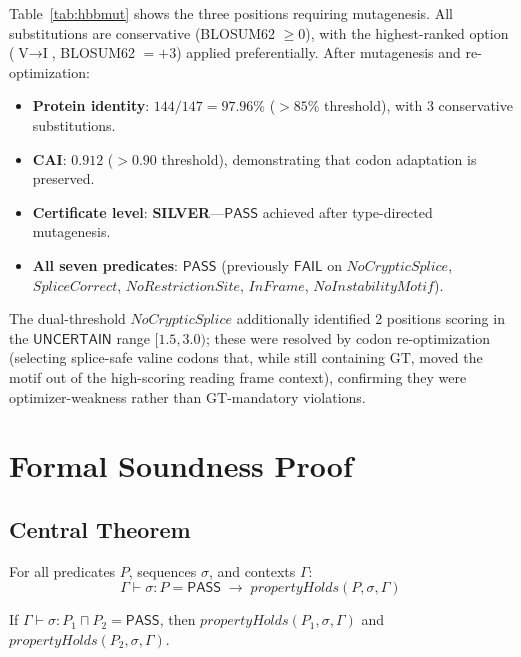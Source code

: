 \documentclass[runningheads]{llncs}
\newcommand{\PASS}{\ensuremath{\mathsf{PASS}}\xspace}
\newcommand{\FAIL}{\ensuremath{\mathsf{FAIL}}\xspace}
\newcommand{\UNCERTAIN}{\ensuremath{\mathsf{UNCERTAIN}}\xspace}
\newcommand{\tand}{\sqcap}
\newcommand{\seq}{\sigma}
\newcommand{\pred}{P}
\newcommand{\judg}[3]{#1 \vdash #2 : #3}
\begin{document}
Table~\ref{tab:hbbmut} shows the three positions requiring mutagenesis.
All substitutions are conservative (BLOSUM62 $\ge 0$), with the highest-ranked option ($\text{V}\to\text{I}$, BLOSUM62 $= +3$) applied preferentially.
After mutagenesis and re-optimization:

\begin{itemize}[leftmargin=*,itemsep=0pt,topsep=1pt]
\item \textbf{Protein identity}: $144/147 = 97.96\%$ ($>85\%$ threshold), with 3 conservative substitutions.
\item \textbf{CAI}: $0.912$ ($>0.90$ threshold), demonstrating that codon adaptation is preserved.
\item \textbf{Certificate level}: \textbf{SILVER}---\PASS{} achieved after type-directed mutagenesis.
\item \textbf{All seven predicates}: \PASS{} (previously \FAIL{} on $\mathit{NoCrypticSplice}$, $\mathit{SpliceCorrect}$, $\mathit{NoRestrictionSite}$, $\mathit{InFrame}$, $\mathit{NoInstabilityMotif}$).
\end{itemize}

The dual-threshold $\mathit{NoCrypticSplice}$ additionally identified 2 positions scoring in the \UNCERTAIN{} range $[1.5, 3.0)$; these were resolved by codon re-optimization (selecting splice-safe valine codons that, while still containing GT, moved the motif out of the high-scoring reading frame context), confirming they were optimizer-weakness rather than GT-mandatory violations.

\section{Formal Soundness Proof}\label{sec:soundness}

\subsection{Central Theorem}

\begin{theorem}\label{thm:sound}
For all predicates $\pred$, sequences $\seq$, and contexts $\Gamma$:
\[
  \judg{\Gamma}{\seq}{\pred} = \PASS \;\longrightarrow\; \mathit{propertyHolds}(\pred, \seq, \Gamma)
\]
\end{theorem}

\begin{corollary}\label{cor:comp}
If $\judg{\Gamma}{\seq}{\pred_1 \tand \pred_2} = \PASS$, then $\mathit{propertyHolds}(\pred_1, \seq, \Gamma)$ and $\mathit{propertyHolds}(\pred_2, \seq, \Gamma)$.
\end{corollary}
\end{document}
